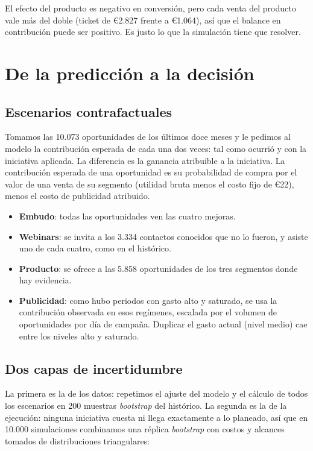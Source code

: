 \documentclass[11pt,letterpaper]{article}
\begin{document}
El efecto del producto es negativo en conversión, pero cada venta del producto vale más del doble (ticket de
€2.827 frente a €1.064), así que el balance en contribución puede ser positivo. Es justo lo que la simulación
tiene que resolver.

\section{De la predicción a la decisión}

\subsection{Escenarios contrafactuales}

Tomamos las 10.073 oportunidades de los últimos doce meses y le pedimos al modelo la contribución esperada de
cada una dos veces: tal como ocurrió y con la iniciativa aplicada. La diferencia es la ganancia atribuible a la
iniciativa. La contribución esperada de una oportunidad es su probabilidad de compra por el valor de una venta
de su segmento (utilidad bruta menos el costo fijo de €22), menos el costo de publicidad atribuido.

\begin{itemize}
  \item \textbf{Embudo}: todas las oportunidades ven las cuatro mejoras.
  \item \textbf{Webinars}: se invita a los 3.334 contactos conocidos que no lo fueron, y asiste uno de cada
        cuatro, como en el histórico.
  \item \textbf{Producto}: se ofrece a las 5.858 oportunidades de los tres segmentos donde hay evidencia.
  \item \textbf{Publicidad}: como hubo periodos con gasto alto y saturado, se usa la contribución observada en
        esos regímenes, escalada por el volumen de oportunidades por día de campaña. Duplicar el gasto actual
        (nivel medio) cae entre los niveles alto y saturado.
\end{itemize}

\subsection{Dos capas de incertidumbre}

La primera es la de los datos: repetimos el ajuste del modelo y el cálculo de todos los escenarios en 200
muestras \textit{bootstrap} del histórico. La segunda es la de la ejecución: ninguna iniciativa cuesta ni llega
exactamente a lo planeado, así que en 10.000 simulaciones combinamos una réplica \textit{bootstrap} con costos y
alcances tomados de distribuciones triangulares:
\end{document}
